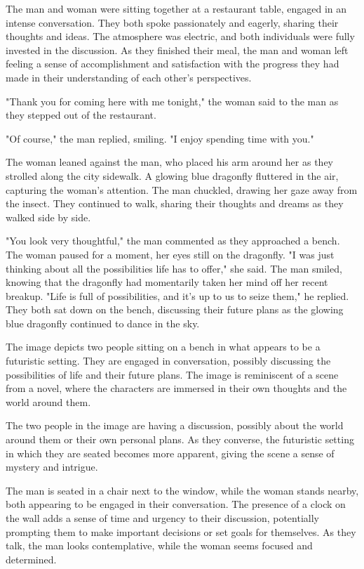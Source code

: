 \documentclass[smalldemyvopaper,11pt,twoside,onecolumn,openright,extrafontsizes]{memoir}
\begin{document}
The man and woman were sitting together at a restaurant table, engaged in an intense conversation. They both spoke passionately and eagerly, sharing their thoughts and ideas. The atmosphere was electric, and both individuals were fully invested in the discussion. As they finished their meal, the man and woman left feeling a sense of accomplishment and satisfaction with the progress they had made in their understanding of each other's perspectives.\par
"Thank you for coming here with me tonight," the woman said to the man as they stepped out of the restaurant.\par
"Of course," the man replied, smiling. "I enjoy spending time with you."\par
The woman leaned against the man, who placed his arm around her as they strolled along the city sidewalk. A glowing blue dragonfly fluttered in the air, capturing the woman's attention. The man chuckled, drawing her gaze away from the insect. They continued to walk, sharing their thoughts and dreams as they walked side by side.\par
"You look very thoughtful," the man commented as they approached a bench. The woman paused for a moment, her eyes still on the dragonfly. "I was just thinking about all the possibilities life has to offer," she said. The man smiled, knowing that the dragonfly had momentarily taken her mind off her recent breakup. "Life is full of possibilities, and it's up to us to seize them," he replied. They both sat down on the bench, discussing their future plans as the glowing blue dragonfly continued to dance in the sky.\par
The image depicts two people sitting on a bench in what appears to be a futuristic setting. They are engaged in conversation, possibly discussing the possibilities of life and their future plans. The image is reminiscent of a scene from a novel, where the characters are immersed in their own thoughts and the world around them.\par
The two people in the image are having a discussion, possibly about the world around them or their own personal plans. As they converse, the futuristic setting in which they are seated becomes more apparent, giving the scene a sense of mystery and intrigue.\par
The man is seated in a chair next to the window, while the woman stands nearby, both appearing to be engaged in their conversation. The presence of a clock on the wall adds a sense of time and urgency to their discussion, potentially prompting them to make important decisions or set goals for themselves. As they talk, the man looks contemplative, while the woman seems focused and determined.\par
\end{document}
